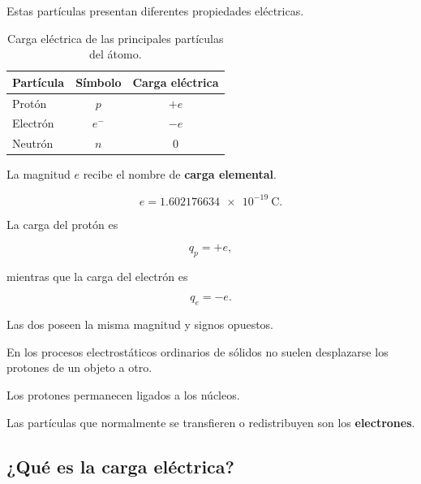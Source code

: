 Estas partículas presentan diferentes propiedades eléctricas.

\begin{table}[H]
    \centering

    \caption{Carga eléctrica de las principales partículas del átomo.}

    \begin{tabular}{lcc}
        \toprule
        Partícula & Símbolo & Carga eléctrica \\
        \midrule
        Protón    & \(p\) & \(+e\) \\
        Electrón  & \(e^{-}\) & \(-e\) \\
        Neutrón   & \(n\) & \(0\) \\
        \bottomrule
    \end{tabular}

\end{table}

La magnitud \(e\) recibe el nombre de \textbf{carga elemental}.

\begin{equation}
    e
    =
    \SI{1.602176634e-19}{\coulomb}.
    \label{eq:carga_elemental}
\end{equation}

La carga del protón es

\begin{equation}
    q_p=+e,
\end{equation}

mientras que la carga del electrón es

\begin{equation}
    q_e=-e.
\end{equation}

Las dos poseen la misma magnitud y signos opuestos.

\begin{idea}
En los procesos electrostáticos ordinarios de sólidos no suelen desplazarse
los protones de un objeto a otro.

Los protones permanecen ligados a los núcleos.

Las partículas que normalmente se transfieren o redistribuyen son los
\textbf{electrones}.
\end{idea}



\subsection{¿Qué es la carga eléctrica?}

